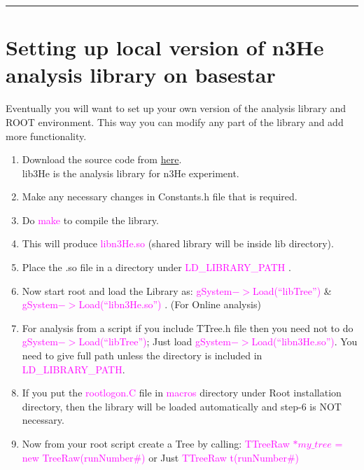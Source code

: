 \documentclass[12pt]{article}
\begin{document}
\noindent
{\color{red} \rule{\linewidth}{1mm} }
 
\newpage
\section{Setting up local version of n3He analysis library on basestar}
Eventually you will want to set up your own version of the analysis library and ROOT environment. This way you can modify any
part of the library and add more functionality. 

\begin{enumerate}
\item Download the source code from \href{http://latifkabir.github.io/n3He_Soft/}{here}. \\
lib3He is the analysis library for n3He experiment.

\item Make any necessary changes in Constants.h file that is required.

\item Do \textcolor{magenta}{ make} to compile the library. 

\item This will produce  \textcolor{magenta}{libn3He.so} (shared library will be inside lib directory).

\item Place the .so file in a directory under \textcolor{magenta}{ LD\_LIBRARY\_PATH }.

\item Now start root and load the Library as: \textcolor{magenta}{gSystem$->$Load(``libTree'')}  \& \textcolor{magenta}{gSystem$->$Load(``libn3He.so'')}  . (For Online analysis)

\item  For analysis from a script if you include TTree.h file then you need not to do \textcolor{magenta}{gSystem$->$Load(``libTree'')}; Just load 
    \textcolor{magenta}{gSystem$->$Load(``libn3He.so'')}.  You need to give full path unless the directory is included in \textcolor{magenta}{LD\_LIBRARY\_PATH}.

\item If you put the \textcolor{magenta}{rootlogon.C} file in \textcolor{magenta}{ macros } directory under Root installation directory, then the library will be loaded automatically and step-6 is NOT necessary.

\item Now from your root script create a Tree by calling: \textcolor{magenta}{TTreeRaw ${\ast}my\_tree$ = new TreeRaw(runNumber\#)} or Just \textcolor{magenta}{TTreeRaw t(runNumber\#)}


\end{enumerate}
\end{document}
